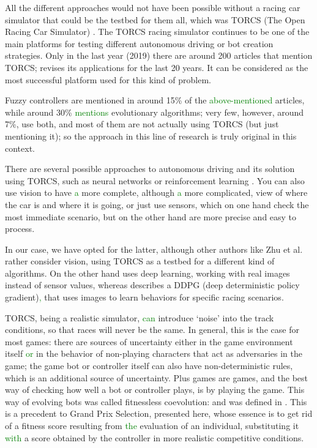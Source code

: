 \documentclass[10pt,journal,compsoc]{IEEEtran}
\begin{document}

All the different approaches would not have been possible without a
racing car simulator that could be the testbed for them all, which was
TORCS (The Open Racing Car Simulator) \cite{torcs4}. The TORCS racing simulator
continues to be one of the main platforms for testing different autonomous driving or bot creation strategies. Only in the last year (2019) there are around 200 articles that mention TORCS; \cite{badue2019selfdriving} revises its applications for the last 20 years. It can be considered as the most successful platform used for this kind of problem.

Fuzzy controllers are mentioned in around 15\% of the \textcolor{green}{above-mentioned} articles, while around 30\% \textcolor{green}{mentions} evolutionary algorithms; very few, however, around 7\%, use both, and most of them are not actually using TORCS (but just mentioning it); so the approach in this line of research is truly original in this context.

There are several possible approaches to autonomous driving and its
solution using TORCS, such as neural networks or reinforcement learning \cite{abuzekry2comparative}. 
You can also use vision to have \textcolor{green}{a} more complete, although \textcolor{green}{a} more complicated, view of where the car is and where it is going, or just use sensors, which on one hand check the most immediate scenario, but on the other hand are more precise and easy to process.

In our case, we have opted for the latter, although other authors like Zhu et al. \cite{zhu2019vision} rather
consider vision, using TORCS as a testbed for a different kind of
algorithms. On the other hand \cite{8833873} uses deep learning, working with real images instead of sensor values, whereas \cite{Kaushik_2018_ECCV_Workshops} describes a DDPG (deep deterministic policy gradient)\textcolor{green}{,} that uses images to learn behaviors for specific racing scenarios.

TORCS, being a realistic simulator, \textcolor{green}{can} introduce `noise' into
the track conditions, so that races will never be the same. In
general, this is the case for most games: there are sources of
uncertainty either in the game environment itself \textcolor{green}{or} in the behavior
of non-playing characters that act as adversaries in the game; the
game bot or controller itself can also have non-deterministic rules,
which is an additional source of uncertainty. Plus games are games,
and the best way of checking how well a bot or controller plays, is by
playing the game. This way of evolving bots was called fitnessless
coevolution: and was defined in
\cite{Jaskowski:2008:FC:1389095.1389161}. This is a precedent to
Grand Prix Selection, presented here, whose essence is
to get rid of a fitness score resulting from \textcolor{green}{the} evaluation of an individual, substituting it \textcolor{green}{with} a score obtained by the controller in
more realistic competitive conditions.
\end{document}

